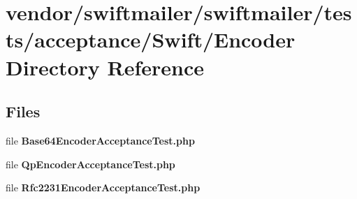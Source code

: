 \section{vendor/swiftmailer/swiftmailer/tests/acceptance/\+Swift/\+Encoder Directory Reference}
\label{dir_1f47389c212350f63e8abc2f95fa9123}
\subsection*{Files}
\begin{DoxyCompactItemize}
\item 
file {\bf Base64\+Encoder\+Acceptance\+Test.\+php}
\item 
file {\bf Qp\+Encoder\+Acceptance\+Test.\+php}
\item 
file {\bf Rfc2231\+Encoder\+Acceptance\+Test.\+php}
\end{DoxyCompactItemize}
